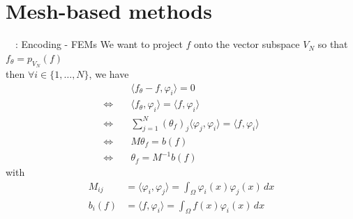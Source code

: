 \section{Mesh-based methods}

\begin{frame}{\appendixname~\theappendixframenumber~: Encoding - FEMs}
	We want to project $f$ onto the vector subspace $V_N$ so that $f_\theta = p_{V_N}(f)$ \\	
	then $\forall i \in \{1,\dots,N\}$, we have
	\begin{align*}
		&\quad \langle f_\theta - f, \varphi_i \rangle = 0 \\
		\iff &\quad \langle f_\theta, \varphi_i \rangle = \langle f, \varphi_i \rangle \quad  \\
		\iff &\quad \sum_{j=1}^N(\theta_f)_j \langle \varphi_j, \varphi_i\rangle = \langle f, \varphi_i \rangle \\ 
		\iff &\quad M \theta_f = b(f) \\
		\iff &\quad \theta_f = M^{-1} b(f)
	\end{align*}	
	with 
	\begin{align*}
		M_{ij} &= \langle \varphi_i, \varphi_j\rangle = \int_{\Omega} \varphi_i(x) \varphi_j(x) \, dx \\
		b_i(f) &= \langle f, \varphi_i \rangle = \int_{\Omega} f(x) \varphi_i(x) \, dx
	\end{align*}	
\end{frame}
\addtocounter{appendixframenumber}{1}

